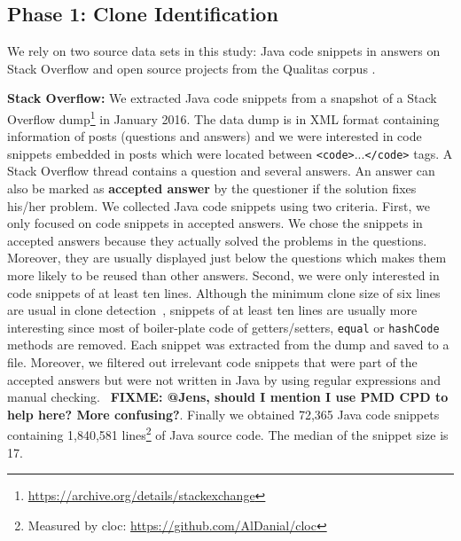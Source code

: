 \documentclass[10pt,journal,compsoc]{IEEEtran}
\newcommand\FIXME[1]{{\color{red}\textbf{FIXME: #1}}}
\begin{document}
\subsection{Phase 1: Clone Identification}

We rely on two source data sets in this study: Java code snippets in answers
on Stack Overflow and open source projects from the Qualitas corpus
\cite{QualitasCorpus}.

\textbf{Stack Overflow:} 
We extracted Java code snippets from a snapshot of a Stack Overflow
dump\footnote{\url{https://archive.org/details/stackexchange}} in January 2016.
The data dump is in XML format containing information of posts (questions and
answers) and we were interested in code snippets embedded in posts which were
located between {\small\texttt{<code>}...\texttt{</code>}} tags. A Stack
Overflow thread contains a question and several answers. An answer can also be
marked as \textbf{accepted answer} by the questioner if the solution fixes
his/her problem. We collected Java code snippets using two criteria. First, we
only focused on code snippets in accepted answers. We chose the snippets in
accepted answers because they actually solved the problems in the questions.
Moreover, they are usually displayed just below the questions which makes them
more likely to be reused than other answers. Second, we were only interested in
code snippets of at least ten lines. Although the minimum clone size of six
lines are usual in clone detection~\cite{Bellon2007,Wang2013,Koschke2006},
snippets of at least ten lines are usually more interesting since most of
boiler-plate code of getters/setters, \texttt{equal} or \texttt{hashCode} methods are removed.
Each snippet was extracted from the dump and saved to a file. Moreover, we
filtered out irrelevant code snippets that were part of the accepted answers
but were not written in Java by using regular expressions and manual checking.
~\FIXME{@Jens, should I mention I use PMD CPD to help here? More confusing?}.
Finally we obtained
72,365 Java code snippets containing 1,840,581 lines\footnote{Measured by cloc:
	\url{https://github.com/AlDanial/cloc}} of Java source code. The median of the
snippet size is 17.
\end{document}
